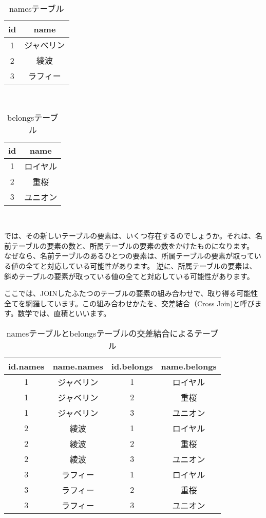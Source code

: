 \begin{table}[htb]
  \begin{tabular}{|c|c|} \hline
    id & name \\ \hline
    1 & ジャベリン \\
    2 & 綾波 \\
    3 & ラフィー \\ \hline
  \end{tabular}
　　\label{table:names}
　　\caption{namesテーブル}
\end{table}

\begin{table}[htb]
  \begin{tabular}{|c|c|} \hline
    id & name \\ \hline
    1 & ロイヤル \\
    2 & 重桜 \\
    3 & ユニオン \\ \hline
  \end{tabular}
　　\label{table:belongs}
　　\caption{belongsテーブル}
\end{table}

では、その新しいテーブルの要素は、いくつ存在するのでしょうか。それは、名前テーブルの要素の数と、所属テーブルの要素の数をかけたものになります。
なぜなら、名前テーブルのあるひとつの要素は、所属テーブルの要素が取っている値の全てと対応している可能性があります。
逆に、所属テーブルの要素は、斜めテーブルの要素が取っている値の全てと対応している可能性があります。

ここでは、JOINしたふたつのテーブルの要素の組み合わせで、取り得る可能性全てを網羅しています。この組み合わせかたを、交差結合（Cross Join)と呼びます。数学では、直積といいます。


\begin{table}[htb]
  \begin{tabular}{|c|c|c|c|} \hline
    id.names & name.names & id.belongs & name.belongs \\ \hline
    1 & ジャベリン & 1 & ロイヤル \\
    1 & ジャベリン & 2 & 重桜 \\
    1 & ジャベリン & 3 & ユニオン \\
    2 & 綾波 & 1 & ロイヤル \\
    2 & 綾波 & 2 & 重桜 \\
    2 & 綾波 & 3 & ユニオン \\
    3 & ラフィー & 1 & ロイヤル \\
    3 & ラフィー & 2 & 重桜 \\
    3 & ラフィー & 3 & ユニオン \\ \hline
  \end{tabular}
　　\label{table:belongs}
　　\caption{namesテーブルとbelongsテーブルの交差結合によるテーブル}
\end{table}


